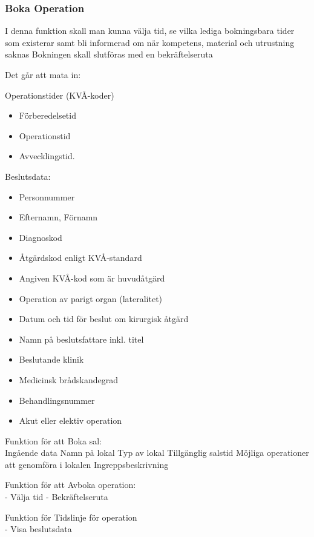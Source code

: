 \documentclass[a4paper,10pt]{article}
\begin{document}
    \subsubsection{Boka Operation}
    
I denna funktion skall man kunna välja tid, se vilka lediga bokningsbara tider som existerar samt bli informerad om när kompetens, material och utrustning saknas
Bokningen skall slutföras med en bekräftelseruta

Det går att mata in:

Operationstider (KVÅ-koder)
\begin{itemize}
	\item Förberedelsetid 
	\item Operationstid 
	\item Avvecklingstid. 
\end{itemize}

Beslutsdata:

\begin{itemize}
	\item Personnummer
	\item Efternamn, Förnamn
	\item Diagnoskod
	\item Åtgärdskod enligt KVÅ-standard
	\item Angiven KVÅ-kod som är huvudåtgärd
	\item Operation av parigt organ (lateralitet)
	\item Datum och tid för beslut om kirurgisk åtgärd
	\item Namn på beslutsfattare inkl. titel
	\item Beslutande klinik
	\item Medicinsk brådskandegrad
	\item Behandlingsnummer
	\item Akut eller elektiv operation	
	
\end{itemize}


Funktion för att Boka sal: \\
Ingående data 
Namn på lokal
Typ av lokal
Tillgänglig salstid
Möjliga operationer att genomföra i lokalen
Ingreppsbeskrivning

Funktion för att Avboka operation: \\
-	Välja tid
-	Bekräftelseruta

Funktion för Tidslinje för operation \\
-	Visa beslutsdata
\end{document}
